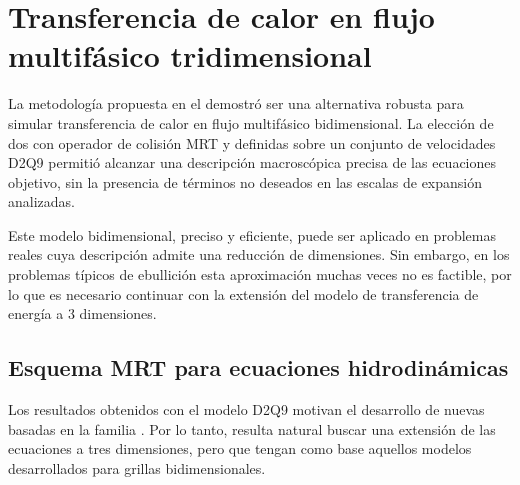 \chapter{Transferencia de calor en flujo multif\'asico tridimensional}

La metodolog\'ia propuesta en el  demostr\'o ser una alternativa robusta para simular transferencia de calor en flujo multif\'asico bidimensional. La elecci\'on de dos \red{\lbe{}} con operador de colisi\'on MRT y definidas sobre un conjunto de velocidades D2Q9 permiti\'o alcanzar una descripci\'on macrosc\'opica precisa de las ecuaciones objetivo, sin la presencia de t\'erminos no deseados en las escalas de expansi\'on analizadas. 

Este modelo bidimensional, preciso y eficiente, puede ser aplicado en problemas reales cuya descripci\'on admite una reducci\'on de dimensiones. Sin embargo, en los problemas t\'ipicos de ebullici\'on esta aproximaci\'on muchas veces no es factible, por lo que es necesario continuar con la extensi\'on del modelo de transferencia de energ\'ia a 3 dimensiones.


\section{Esquema MRT para ecuaciones hidrodin\'amicas}

Los resultados obtenidos con el modelo D2Q9 motivan el desarrollo de nuevas \lbe{} basadas en la familia \pp{}. Por lo tanto, resulta natural buscar una extensi\'on de las ecuaciones a tres dimensiones, pero que tengan como base aquellos modelos desarrollados para grillas bidimensionales.

